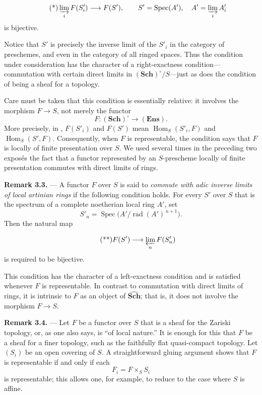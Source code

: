\[
  \tag{*}
  \varinjlim_i F(S'_i)\longrightarrow F(S'),
  \qquad
  S'=\operatorname{Spec}(A'),
  \quad
  A'=\varinjlim_i A'_i
\]
is bijective.

Notice that \(S'\) is precisely the inverse limit of the \(S'_i\) in
the category of preschemes, and even in the category of all ringed
spaces.  Thus the condition under consideration has the character of
a right-exactness condition---commutation with certain direct limits
in \((\mathbf{Sch})^\circ/S\)---just as does the condition of being a
sheaf for a topology.

Care must be taken that this condition is essentially relative: it
involves the morphism \(F\to S\), not merely the functor
\[
  F:(\mathbf{Sch})^\circ\longrightarrow(\mathbf{Ens}).
\]
More precisely, in , \(F(S'_i)\) and \(F(S')\) mean
\(\operatorname{Hom}_S(S'_i,F)\) and
\(\operatorname{Hom}_S(S',F)\).  Consequently, when \(F\) is
representable, the condition says that \(F\) is locally of finite
presentation over \(S\).  We used several times in the preceding two
exposés the fact that a functor represented by an \(S\)-prescheme
locally of finite presentation commutes with direct limits of rings.

\medskip
\noindent{}\textbf{Remark 3.3.} ---
A functor \(F\) over \(S\) is said to \emph{commute with adic inverse
limits of local artinian rings} if the following condition holds.
For every \(S'\) over \(S\) that is the spectrum of a complete
noetherian local ring \(A'\), set
\[
  S'_n=\operatorname{Spec}
  \bigl(A'/\operatorname{rad}(A')^{\,n+1}\bigr).
\]
Then the natural map

\[
  \tag{**}
  F(S')\longrightarrow\varprojlim_n F(S'_n)
\]
is required to be bijective.

This condition has the character of a left-exactness condition and
is satisfied whenever \(F\) is representable.  In contrast to
commutation with direct limits of rings, it is intrinsic to \(F\) as
an object of \(\widehat{\mathbf{Sch}}\); that is, it does not involve
the morphism \(F\to S\).

\medskip
\noindent{}\textbf{Remark 3.4.} ---
Let \(F\) be a functor over \(S\) that is a sheaf for the Zariski
topology, or, as one also says, is ``of local nature.''  It is enough
for this that \(F\) be a sheaf for a finer topology, such as the
faithfully flat quasi-compact topology.  Let \((S_i)\) be an open
covering of \(S\).  A straightforward gluing argument shows that
\(F\) is representable if and only if each
\[
  F_i=F\times_S S_i
\]
is representable; this allows one, for example, to reduce to the case
where \(S\) is affine.

